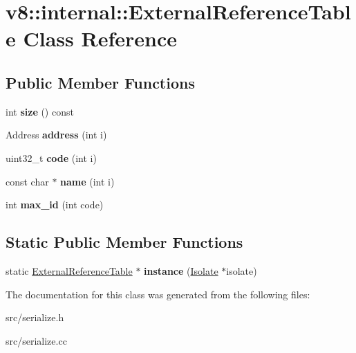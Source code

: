 \hypertarget{classv8_1_1internal_1_1_external_reference_table}{}\section{v8\+:\+:internal\+:\+:External\+Reference\+Table Class Reference}
\label{classv8_1_1internal_1_1_external_reference_table}
\subsection*{Public Member Functions}
\begin{DoxyCompactItemize}
\item 
\hypertarget{classv8_1_1internal_1_1_external_reference_table_a31ed81fd24ee078331b448fa62d7bbfe}{}int {\bfseries size} () const \label{classv8_1_1internal_1_1_external_reference_table_a31ed81fd24ee078331b448fa62d7bbfe}

\item 
\hypertarget{classv8_1_1internal_1_1_external_reference_table_a50b3170564dc57ee820f3f4f65494fac}{}Address {\bfseries address} (int i)\label{classv8_1_1internal_1_1_external_reference_table_a50b3170564dc57ee820f3f4f65494fac}

\item 
\hypertarget{classv8_1_1internal_1_1_external_reference_table_abf9095a478145e1c4bc3de9e0c259f04}{}uint32\+\_\+t {\bfseries code} (int i)\label{classv8_1_1internal_1_1_external_reference_table_abf9095a478145e1c4bc3de9e0c259f04}

\item 
\hypertarget{classv8_1_1internal_1_1_external_reference_table_a2c161796d916c906e6b1530376f89e5b}{}const char $\ast$ {\bfseries name} (int i)\label{classv8_1_1internal_1_1_external_reference_table_a2c161796d916c906e6b1530376f89e5b}

\item 
\hypertarget{classv8_1_1internal_1_1_external_reference_table_ab4971badbb2bc53583bbf987bb833203}{}int {\bfseries max\+\_\+id} (int code)\label{classv8_1_1internal_1_1_external_reference_table_ab4971badbb2bc53583bbf987bb833203}

\end{DoxyCompactItemize}
\subsection*{Static Public Member Functions}
\begin{DoxyCompactItemize}
\item 
\hypertarget{classv8_1_1internal_1_1_external_reference_table_a9424724def9b186059ce07339921c3a2}{}static \hyperlink{classv8_1_1internal_1_1_external_reference_table}{External\+Reference\+Table} $\ast$ {\bfseries instance} (\hyperlink{classv8_1_1internal_1_1_isolate}{Isolate} $\ast$isolate)\label{classv8_1_1internal_1_1_external_reference_table_a9424724def9b186059ce07339921c3a2}

\end{DoxyCompactItemize}


The documentation for this class was generated from the following files\+:\begin{DoxyCompactItemize}
\item 
src/serialize.\+h\item 
src/serialize.\+cc\end{DoxyCompactItemize}

